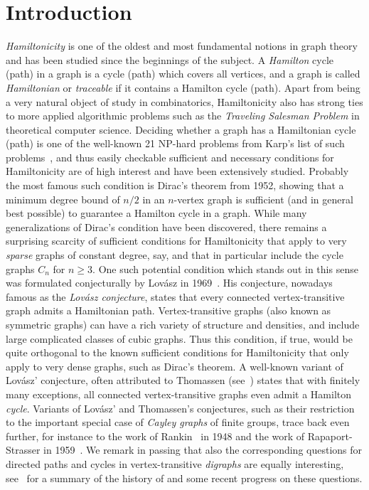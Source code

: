 \documentclass[11pt,reqno]{article}
\begin{document}
\section{Introduction}
\emph{Hamiltonicity} is one of the oldest and most fundamental notions in graph theory and has been studied since the beginnings of the subject.  A \emph{Hamilton} cycle (path) in a graph is a cycle (path) which covers all vertices, and a graph is called \emph{Hamiltonian} or \emph{traceable} if it contains a Hamilton cycle (path).  Apart from being a very natural object of study in combinatorics, Hamiltonicity also has strong ties to more applied algorithmic problems such as the \emph{Traveling Salesman Problem} in theoretical computer science. Deciding whether a graph has a Hamiltonian cycle (path) is one of the well-known 21 \textsc{NP}-hard problems from Karp's list of such problems~\cite{karp}, and thus easily checkable sufficient and necessary conditions for Hamiltonicity are of high interest and have been extensively studied. Probably the most famous such condition is Dirac's theorem from 1952, showing that a minimum degree bound of $n/2$ in an $n$-vertex graph is sufficient (and in general best possible) to guarantee a Hamilton cycle in a graph. While many generalizations of Dirac's condition have been discovered, there remains a surprising scarcity of sufficient conditions for Hamiltonicity that apply to very \emph{sparse} graphs of constant degree, say, and that in particular include the cycle graphs $C_n$ for $n\ge 3$.
One such potential condition which stands out in this sense was formulated conjecturally by Lov\'{a}sz in 1969~\cite{lovasz1969}. His conjecture, nowadays famous as the \emph{Lov\'{a}sz conjecture}, states that every connected vertex-transitive graph admits a Hamiltonian path. Vertex-transitive graphs (also known as symmetric graphs) can have a rich variety of structure and densities, and include large complicated classes of cubic graphs. Thus this condition, if true, would be quite orthogonal to the known sufficient conditions for Hamiltonicity that only apply to very dense graphs, such as Dirac's theorem. A well-known variant of Lov\'{a}sz' conjecture, often attributed to Thomassen (see~\cite{babai}) states that with finitely many exceptions, all connected vertex-transitive graphs even admit a Hamilton \emph{cycle}. Variants of Lov\'{a}sz' and Thomassen's conjectures, such as their restriction to the important special case of \emph{Cayley graphs} of finite groups, trace back even further, for instance to the work of Rankin~\cite{rankin} in 1948 and the work of Rapaport-Strasser in 1959~\cite{RS}. We remark in passing that also the corresponding questions for directed paths and cycles in vertex-transitive \emph{digraphs} are equally interesting, see~\cite{bucic} for a summary of the history of and some recent progress on these questions.
\end{document}
